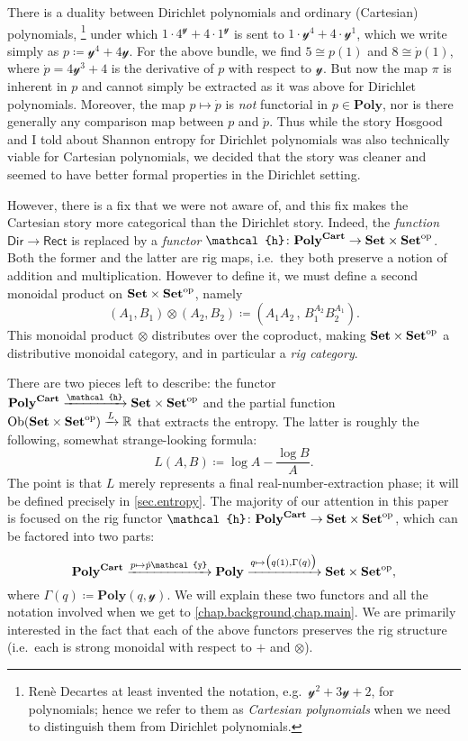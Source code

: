 \documentclass[11pt, one side, article]{memoir}
\theoremstyle{definition}
\theoremstyle{plain}
\DeclareMathOperator{\ob}{Ob}
\newcommand{\Set}[1]{\mathsf{#1}}%
\newcommand{\Cat}[1]{\mathbf{#1}}%
\newcommand{\To}[2][]{\xrightarrow[#1]{#2}}
\newcommand{\op}{^\tn{op}}
\newcommand{\tn}[1]{\textnormal{#1}}
\newcommand{\rr}{\mathbb{R}}
\newcommand{\smset}{\Cat{Set}}
\newcommand{\yon}{\mathcal{y}}
\newcommand{\poly}{\Cat{Poly}}
\newcommand{\dir}{\Set{Dir}}
\newcommand{\rect}{\Set{Rect}}
\newcommand{\polycart}{\poly^{\Cat{Cart}}}
\newcommand{\hh}{\mathcal{h}}
\newcommand{\0}{\textsf{0}}
\newcommand{\1}{\tn{\textsf{1}}}
\begin{document}
There is a duality \cite[Section 4]{spivak2020dirichlet} between Dirichlet polynomials and ordinary (Cartesian) polynomials,%
\footnote{Ren\`{e} Decartes at least invented the notation, e.g.\ $\yon^2+3\yon+2$, for polynomials; hence we refer to them as \emph{Cartesian polynomials} when we need to distinguish them from Dirichlet polynomials.}
 under which $1\cdot 4^\yon+4\cdot 1^\yon$ is sent to $1\cdot\yon^4+4\cdot\yon^1$, which we write simply as $p\coloneqq\yon^4+4\yon$. For the above bundle, we find $5\cong p(1)$ and $8\cong\dot{p}(1)$, where $\dot{p}=4\yon^3+4$ is the derivative of $p$ with respect to $\yon$. But now the map $\pi$ is inherent in $p$ and cannot simply be extracted as it was above for Dirichlet polynomials. Moreover, the map $p\mapsto\dot{p}$ is \emph{not} functorial in $p\in\poly$, nor is there generally any comparison map between $p$ and $\dot{p}$. Thus while the story Hosgood and I told about Shannon entropy for Dirichlet polynomials was also technically viable for Cartesian polynomials, we decided that the story was cleaner and seemed to have better formal properties in the Dirichlet setting.

However, there is a fix that we were not aware of, and this fix makes the Cartesian story more categorical than the Dirichlet story. Indeed, the \emph{function} $\dir\to\rect$ is replaced by a \emph{functor} $\hh\colon\polycart\to\smset\times\smset\op$. Both the former and the latter are rig maps, i.e.\ they both preserve a notion of addition and multiplication. However to define it, we must define a second monoidal product on  $\smset\times\smset\op$, namely
\[
	(A_1,B_1)\otimes(A_2,B_2)\coloneqq\left(A_1A_2\,,\,B_1^{A_2}B_2^{A_1}\right).
\]
This monoidal product $\otimes$ distributes over the coproduct, making $\smset\times\smset\op$ a distributive monoidal category, and in particular a \emph{rig category}.

There are two pieces left to describe: the functor $\polycart\To{\hh}\smset\times\smset\op$ and the partial function $\ob(\smset\times\smset\op)\To{L}\rr$ that extracts the entropy. The latter is roughly the following, somewhat strange-looking formula:
\[
L(A,B)\coloneqq\log A - \frac{\log B}{A}.
\]
The point is that $L$ merely represents a final real-number-extraction phase; it will be defined precisely in \cref{sec.entropy}. The majority of our attention in this paper is focused on the rig functor $\hh\colon\polycart\to\smset\times\smset\op$, which can be factored into two parts:
\[
\polycart\To{p\mapsto\dot{p}\yon}\poly\To{q\mapsto\big(q(1),\Gamma(q)\big)}\smset\times\smset\op,
\]
where $\Gamma(q)\coloneqq\poly(q,\yon)$. We will explain these two functors and all the notation involved when we get to \cref{chap.background,chap.main}. We are primarily interested in the fact that each of the above functors preserves the rig structure (i.e.\ each is strong monoidal with respect to $+$ and $\otimes$).
\end{document}
